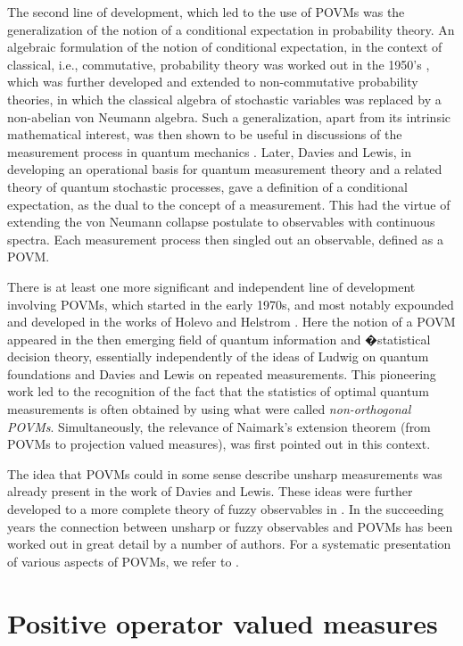 \documentclass[12pt]{amsart}
\theoremstyle{definition}
\begin{document}
The second line of development, which led to the use of POVMs was the generalization
of the notion of a conditional expectation in probability theory. An algebraic formulation of the
notion of conditional expectation, in the context of classical, i.e., commutative, probability
theory was worked out in the 1950's \cite{Moy54, NaTu54}, which was further developed
and extended to non-commutative probability theories, in which the classical
algebra of stochastic variables was replaced by a non-abelian von
Neumann algebra. Such a generalization, apart from its intrinsic mathematical
interest,  was then shown to be  useful in discussions of the measurement process in
quantum mechanics \cite{NaUm62,Umegaki54}.  Later,  Davies and Lewis, in
developing an operational basis for quantum measurement theory and a related
theory of quantum stochastic processes,  \cite{DaLe70,Davies70, QTOS76} gave
a definition of a conditional expectation, as the dual to the concept of a measurement.
This had the virtue of extending the von Neumann collapse postulate to observables
with continuous spectra. Each measurement process then singled out an observable,
defined as a POVM.

There is at least one more significant and independent 
line of development involving
POVMs,  which  started in the early 1970s, and most notably expounded and 
developed in the works of 
Holevo and Helstrom  \cite{He76,Ho82}.  Here the notion of a POVM appeared in the
then emerging field of quantum information and �statistical decision theory,
essentially independently of the ideas of Ludwig on quantum foundations and
Davies and Lewis on repeated measurements. This pioneering work led to the
recognition of the fact that the statistics of  optimal quantum
measurements is often obtained by using what were called {\em non-orthogonal POVMs}.
Simultaneously, the  relevance of  Naimark's extension theorem (from POVMs to projection 
valued measures),  was first pointed out in this context.


The idea that POVMs could in some sense describe unsharp measurements was already
present in the work of Davies and Lewis. These ideas were further developed to a
more complete theory of fuzzy observables in \cite{AlEm74, SQMQS84}. In the
succeeding years the connection between unsharp or fuzzy observables and POVMs
has been worked out in great detail by a number of authors. For a systematic
presentation of various aspects of POVMs, we refer to \cite{OQP97}.

\section{Positive operator valued measures}\label{sec:povm}
\end{document}
